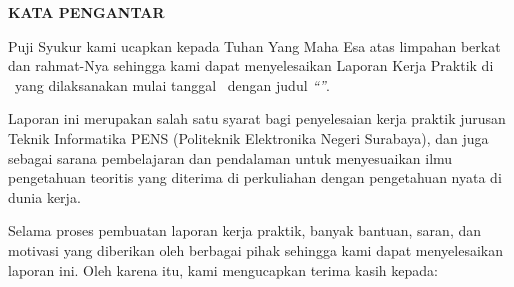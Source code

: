 \cleardoublepage
{}
{}
\begin{center}
  {\fontsize{12}{15}\bfseries KATA PENGANTAR\par}
\end{center}
\vspace{12pt}

Puji Syukur kami ucapkan kepada Tuhan Yang Maha Esa atas limpahan berkat dan rahmat-Nya
sehingga kami dapat menyelesaikan Laporan Kerja Praktik di \NamaPerusahaan\ yang
dilaksanakan mulai tanggal \PeriodeKP\ dengan judul \textit{``\JudulKP''}.

Laporan ini merupakan salah satu syarat bagi penyelesaian kerja praktik jurusan Teknik
Informatika PENS (Politeknik Elektronika Negeri Surabaya), dan juga sebagai sarana
pembelajaran dan pendalaman untuk menyesuaikan ilmu pengetahuan teoritis yang diterima di
perkuliahan dengan pengetahuan nyata di dunia kerja.

Selama proses pembuatan laporan kerja praktik, banyak bantuan, saran, dan motivasi yang
diberikan oleh berbagai pihak sehingga kami dapat menyelesaikan laporan ini. Oleh karena
itu, kami mengucapkan terima kasih kepada:

